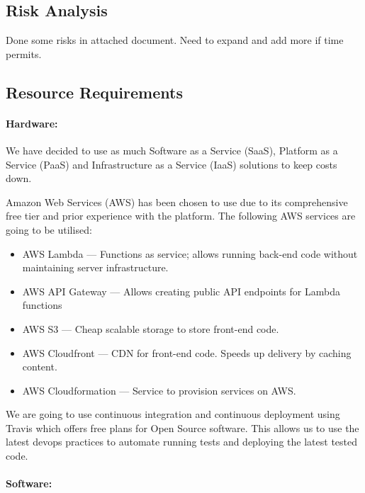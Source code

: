 \documentclass[a4paper,11pt]{article}
\begin{document}
\subsection{Risk Analysis}


Done some risks in attached document. Need to expand and add more if time permits.

\subsection{Resource Requirements}

\paragraph{Hardware:}

We have decided to use as much Software as a Service (SaaS), Platform as a
Service (PaaS) and Infrastructure as a Service (IaaS) solutions to keep costs
down.

Amazon Web Services (AWS) has been chosen to use due to its comprehensive free
tier and prior experience with the platform. The following AWS services are
going to be utilised:

\begin{itemize}
  \item AWS Lambda --- Functions as service; allows running back-end code without
    maintaining server infrastructure.
  \item AWS API Gateway --- Allows creating public API endpoints for Lambda
    functions
  \item AWS S3 --- Cheap scalable storage to store front-end code.
  \item AWS Cloudfront --- CDN for front-end code. Speeds up delivery by caching
    content.
  \item AWS Cloudformation --- Service to provision services on AWS.\@
\end{itemize}

We are going to use continuous integration and continuous deployment using
Travis which offers free plans for Open Source software. This allows us to use
the latest devops practices to automate running tests and deploying the latest
tested code.

\paragraph{Software:}
\end{document}
